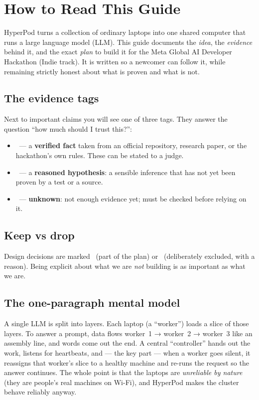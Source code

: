 \section{How to Read This Guide}

HyperPod turns a collection of ordinary laptops into one shared computer that
runs a large language model (LLM). This guide documents the \emph{idea}, the
\emph{evidence} behind it, and the exact \emph{plan} to build it for the Meta
Global AI Developer Hackathon (Indie track). It is written so a newcomer can
follow it, while remaining strictly honest about what is proven and what is not.

\subsection{The evidence tags}
Next to important claims you will see one of three tags. They answer the
question ``how much should I trust this?'':

\begin{itemize}[leftmargin=1.4em,nosep]
  \item \VER\ --- a \textbf{verified fact} taken from an official repository,
  research paper, or the hackathon's own rules. These can be stated to a judge.
  \item \HYP\ --- a \textbf{reasoned hypothesis}: a sensible inference that has
  not yet been proven by a test or a source.
  \item \UNK\ --- \textbf{unknown}: not enough evidence yet; must be checked
  before relying on it.
\end{itemize}

\subsection{Keep vs drop}
Design decisions are marked \Keep\ (part of the plan) or \Drop\ (deliberately
excluded, with a reason). Being explicit about what we are \emph{not} building
is as important as what we are.

\subsection{The one-paragraph mental model}
A single LLM is split into layers. Each laptop (a ``worker'') loads a slice of
those layers. To answer a prompt, data flows worker~1 → worker~2 → worker~3 like
an assembly line, and words come out the end. A central ``controller'' hands out
the work, listens for heartbeats, and --- the key part --- when a worker goes
silent, it reassigns that worker's slice to a healthy machine and re-runs the
request so the answer continues. The whole point is that the laptops are
\emph{unreliable by nature} (they are people's real machines on Wi-Fi), and
HyperPod makes the cluster behave reliably anyway.


